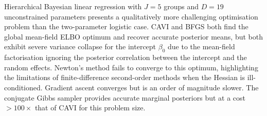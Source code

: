 \documentclass[11pt,a4paper]{article}
\begin{document}
Hierarchical Bayesian linear regression with $J=5$ groups and $D=19$ unconstrained
parameters presents a qualitatively more challenging optimisation problem than the
two-parameter logistic case.
CAVI and BFGS both find the global mean-field ELBO optimum and recover accurate
posterior means, but both exhibit severe variance collapse for the intercept $\beta_0$
due to the mean-field factorisation ignoring the posterior correlation between the
intercept and the random effects.
Newton's method fails to converge to this optimum, highlighting the limitations of
finite-difference second-order methods when the Hessian is ill-conditioned.
Gradient ascent converges but is an order of magnitude slower.
The conjugate Gibbs sampler provides accurate marginal posteriors but at a cost
$>100\times$ that of CAVI for this problem size.

\nocite{*}
\printbibliography
\end{document}
